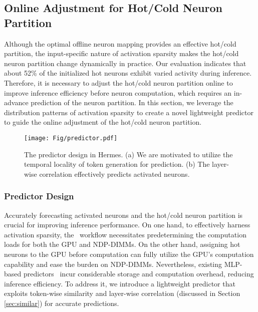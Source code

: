 \subsection{Online Adjustment for Hot/Cold Neuron Partition}\label{sec:partition-design}  

Although the optimal offline neuron mapping provides an effective hot/cold partition, the input-specific nature of activation sparsity makes the hot/cold neuron partition change dynamically in practice. Our evaluation indicates that about 52\% of the initialized hot neurons exhibit varied activity during inference. Therefore, it is necessary to adjust the hot/cold neuron partition online to improve inference efficiency before neuron computation, which requires an in-advance prediction of the neuron partition. In this section, we leverage the distribution patterns of activation sparsity to create a novel lightweight predictor to guide the online adjustment of the hot/cold neuron partition.
\begin{figure}[t]
    \centering
    \texttt{[image: Fig/predictor.pdf]}
    \vspace{-0.3cm}
    \caption{The predictor design in Hermes. (a) We are motivated to utilize the temporal locality of token generation for prediction. (b) The layer-wise correlation effectively predicts activated neurons.}
    \label{fig:predictor}
\vspace{-0.3cm}
\end{figure}

\subsubsection{Predictor Design}\label{sec:predictor-design}
Accurately forecasting activated neurons and the hot/cold neuron partition is crucial for improving inference performance. On one hand, to effectively harness activation sparsity, the \name~workflow necessitates predetermining the computation loads for both the GPU and NDP-DIMMs. On the other hand, assigning hot neurons to the GPU before computation can fully utilize the GPU’s computation capability and ease the burden on NDP-DIMMs. Nevertheless, existing MLP-based predictors~\cite{song2023powerinfer, song2024prosparse, liu2023deja} incur considerable storage and computation overhead, reducing inference efficiency. To address it, we introduce a lightweight predictor that exploits token-wise similarity and layer-wise correlation (discussed in Section \ref{sec:similar}) for accurate predictions.


